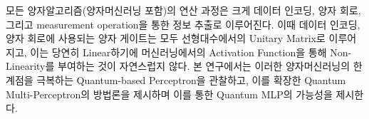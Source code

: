 모든 양자알고리즘(양자머신러닝 포함)의 연산 과정은 크게 데이터 인코딩, 양자 회로, 그리고 measurement operation을 통한 정보 추출로 이루어진다. 이때 데이터 인코딩, 양자 회로에 사용되는 양자 게이트는 모두 선형대수에서의 Unitary Matrix로 이루어지고, 이는 당연히 Linear하기에 머신러닝에서의 Activation Function을 통해 Non-Linearity를 부여하는 것이 자연스럽지 않다. 본 연구에서는 이러한 양자머신러닝의 한계점을 극복하는 Quantum-based Perceptron을 관찰하고, 이를 확장한 Quantum Multi-Perceptron의 방법론을 제시하며 이를 통한 Quantum MLP의 가능성을 제시한다.